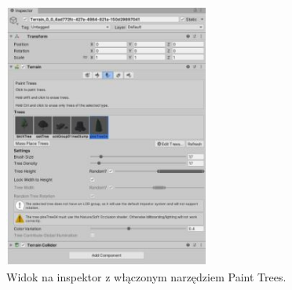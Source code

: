 \begin{figure}[h!]
    \centering
    \includegraphics[width=0.6\textwidth]{images/modelowanie_terenu/malowanie_drzew.jpg}
    \caption{Widok na inspektor z włączonym narzędziem Paint Trees.}\label{fig:malowanie_drzew}
\end{figure}


